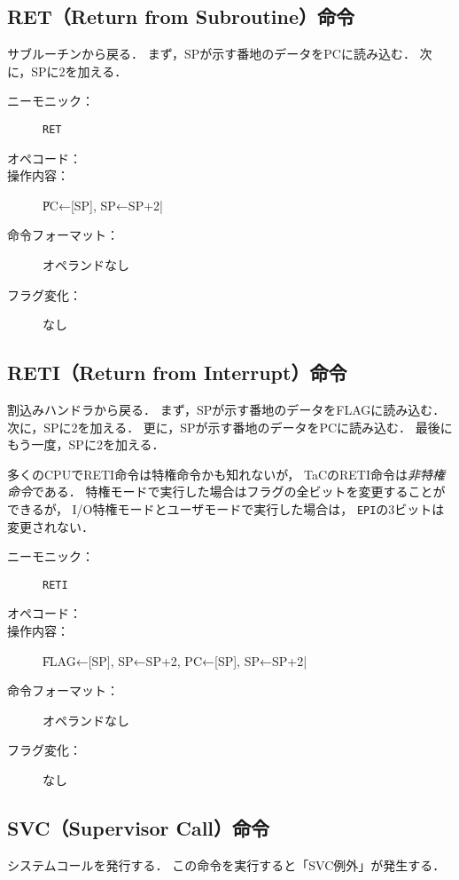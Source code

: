 \subsection{RET（Return from Subroutine）命令}
サブルーチンから戻る．
まず，SPが示す番地のデータをPCに読み込む．
次に，SPに2を加える．

\begin{description}
\item[ニーモニック：] \texttt{RET}
\item[オペコード：] 
\item[操作内容：] \|PC←[SP], SP←SP+2|
\item[命令フォーマット：] オペランドなし
\item[フラグ変化：] なし
\end{description}

\subsection{RETI（Return from Interrupt）命令}
割込みハンドラから戻る．
まず，SPが示す番地のデータをFLAGに読み込む．
次に，SPに2を加える．
更に，SPが示す番地のデータをPCに読み込む．
最後にもう一度，SPに2を加える．

多くのCPUでRETI命令は特権命令かも知れないが，
TaCのRETI命令は\emph{非特権命令}である．
特権モードで実行した場合はフラグの全ビットを変更することができるが，
I/O特権モードとユーザモードで実行した場合は，
\texttt{EPI}の3ビットは変更されない．

\begin{description}
\item[ニーモニック：] \texttt{RETI}
\item[オペコード：] 
\item[操作内容：] \|FLAG←[SP], SP←SP+2, PC←[SP], SP←SP+2|
\item[命令フォーマット：] オペランドなし
\item[フラグ変化：] なし
\end{description}

\subsection{SVC（Supervisor Call）命令}
システムコールを発行する．
この命令を実行すると「SVC例外」が発生する．

